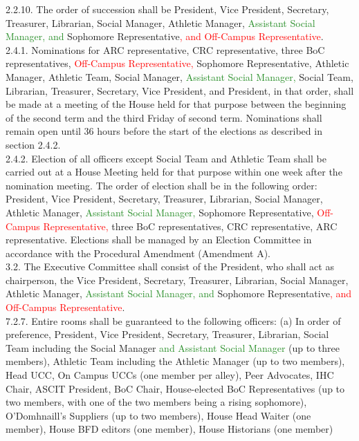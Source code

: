 \documentclass[10pt]{article} %
\begin{document}
\begin{itemize}
	2.2.10. The order of succession shall be President, Vice President, Secretary, Treasurer, Librarian, Social Manager, Athletic Manager, \textcolor{ForestGreen}{Assistant Social Manager, and} Sophomore Representative\textcolor{red}{, and Off-Campus Representative}. \\
	2.4.1. Nominations for ARC representative, CRC representative, three BoC representatives, \textcolor{red}{Off-Campus Representative,} Sophomore Representative, Athletic Manager, Athletic Team, Social Manager, \textcolor{ForestGreen}{Assistant Social Manager,} Social Team, Librarian, Treasurer, Secretary, Vice President, and President, in that order, shall be made at a meeting of the House held for that purpose between the beginning of the second term and the third Friday of second term. Nominations shall remain open until 36 hours before the start of the elections as described in section 2.4.2. \\
	2.4.2. Election of all officers except Social Team and Athletic Team shall be carried out at a House Meeting held for that purpose within one week after the nomination meeting. The order of election shall be in the following order: President, Vice President, Secretary, Treasurer, Librarian, Social Manager, Athletic Manager, \textcolor{ForestGreen}{Assistant Social Manager,} Sophomore Representative, \textcolor{red}{Off-Campus Representative,} three BoC representatives, CRC representative, ARC representative. Elections shall be managed by an Election Committee in accordance with the Procedural Amendment (Amendment A). \\
	3.2. The Executive Committee shall consist of the President, who shall act as chairperson, the Vice President, Secretary, Treasurer, Librarian, Social Manager, Athletic Manager, \textcolor{ForestGreen}{Assistant Social Manager, and} Sophomore Representative\textcolor{red}{, and Off-Campus Representative}. \\
	7.2.7. Entire rooms shall be guaranteed to the following officers: (a) In order of preference, President, Vice President, Secretary, Treasurer, Librarian, Social Team including the Social Manager \textcolor{ForestGreen}{and Assistant Social Manager} (up to three members), Athletic Team including the Athletic Manager (up to two members), Head UCC, On Campus UCCs (one member per alley), Peer Advocates, IHC Chair, ASCIT President, BoC Chair, House-elected BoC Representatives (up to two members, with one of the two members being a rising sophomore), O’Domhnaill’s Suppliers (up to two members), House Head Waiter (one member), House BFD editors (one member), House Historians (one member) \\

\end{itemize}
\end{document}
